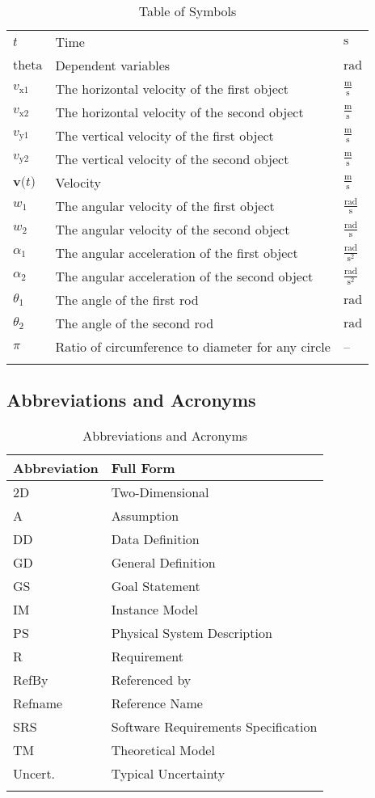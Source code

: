 \documentclass[12pt]{article}
\begin{document}
\begin{longtable}{l l l}
$t$ & Time & ${\text{s}}$
\\
$\text{theta}$ & Dependent variables & ${\text{rad}}$
\\
${v_{\text{x}1}}$ & The horizontal velocity of the first object & $\frac{\text{m}}{\text{s}}$
\\
${v_{\text{x}2}}$ & The horizontal velocity of the second object & $\frac{\text{m}}{\text{s}}$
\\
${v_{\text{y}1}}$ & The vertical velocity of the first object & $\frac{\text{m}}{\text{s}}$
\\
${v_{\text{y}2}}$ & The vertical velocity of the second object & $\frac{\text{m}}{\text{s}}$
\\
$\symbf{v}\text{(}t\text{)}$ & Velocity & $\frac{\text{m}}{\text{s}}$
\\
${w_{1}}$ & The angular velocity of the first object & $\frac{\text{rad}}{\text{s}}$
\\
${w_{2}}$ & The angular velocity of the second object & $\frac{\text{rad}}{\text{s}}$
\\
${α_{1}}$ & The angular acceleration of the first object & $\frac{\text{rad}}{\text{s}^{2}}$
\\
${α_{2}}$ & The angular acceleration of the second object & $\frac{\text{rad}}{\text{s}^{2}}$
\\
${θ_{1}}$ & The angle of the first rod & ${\text{rad}}$
\\
${θ_{2}}$ & The angle of the second rod & ${\text{rad}}$
\\
$π$ & Ratio of circumference to diameter for any circle & --
\\
\bottomrule
\caption{Table of Symbols}
\label{Table:ToS}
\end{longtable}
\subsection{Abbreviations and Acronyms}
\label{Sec:TAbbAcc}
\begin{longtable}{l l}
\toprule
\textbf{Abbreviation} & \textbf{Full Form}
\\
\midrule
\endhead
2D & Two-Dimensional
\\
A & Assumption
\\
DD & Data Definition
\\
GD & General Definition
\\
GS & Goal Statement
\\
IM & Instance Model
\\
PS & Physical System Description
\\
R & Requirement
\\
RefBy & Referenced by
\\
Refname & Reference Name
\\
SRS & Software Requirements Specification
\\
TM & Theoretical Model
\\
Uncert. & Typical Uncertainty
\\
\bottomrule
\caption{Abbreviations and Acronyms}
\label{Table:TAbbAcc}
\end{longtable}
\end{document}
